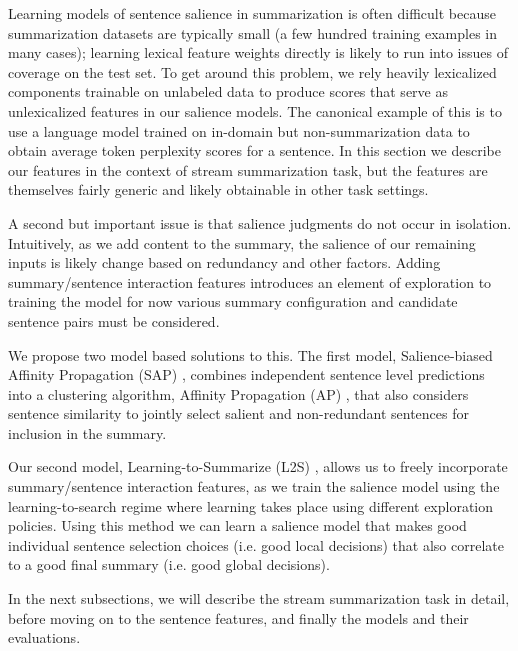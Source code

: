 Learning models of sentence salience in summarization is often difficult
because summarization datasets are typically small (a few hundred training
examples in many cases); learning lexical 
feature weights directly is likely to run into issues of coverage on the test
set. To get around this problem, we rely heavily lexicalized components 
trainable on unlabeled data to produce scores that serve as unlexicalized 
features in our salience models. The canonical example of this is to use 
a language model trained on in-domain but non-summarization data to 
obtain average token perplexity scores for a sentence. In this section we 
describe our features in the context of stream summarization task, but the 
features are themselves fairly generic and likely obtainable in other task
settings.

A second but important issue is that salience judgments do not occur
in isolation. Intuitively, as we add content to the summary, the salience
of our remaining inputs is likely change based on redundancy and other factors.
Adding summary/sentence interaction features introduces an element of 
exploration to training the model for now various summary configuration 
and candidate sentence pairs must be considered.

We propose two model based solutions to this. 
The first model, Salience-biased Affinity Propagation (SAP) 
\citep{kedzie2015predicting}, combines 
independent sentence level predictions into a clustering algorithm,
Affinity Propagation (AP) \citep{frey2007clustering}, that also 
considers sentence similarity to jointly select salient and 
non-redundant sentences for inclusion in the summary.

Our second model, Learning-to-Summarize (L2S) \citep{kedzie2016real}, allows 
us to freely incorporate summary/sentence interaction
features, as we train the salience model using the learning-to-search regime
\cite{daume2009search,chang2015learning}
where learning takes place using different exploration policies. Using 
this method we can learn a salience model that makes good individual sentence
selection choices (i.e. good local decisions) that also correlate to a good 
final summary (i.e. good global decisions). 

In the next subsections, we will describe the stream summarization task
in detail, before moving on to the sentence features, and finally the models
and their evaluations.



